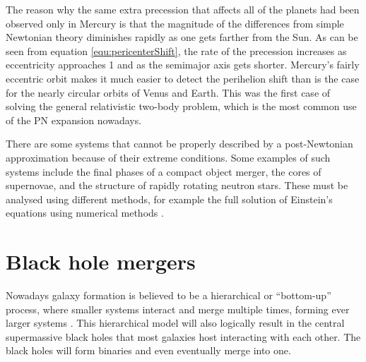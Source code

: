 \documentclass[english, oneside]{HYgradu}
\begin{document}
The reason why the same extra precession that affects all of the planets had been observed only in Mercury is that the magnitude of the differences from simple Newtonian theory diminishes rapidly as one gets farther from the Sun. As can be seen from equation \ref{equ:pericenterShift}, the rate of the precession increases as eccentricity approaches 1 and as the semimajor axis gets shorter.  Mercury's fairly eccentric orbit makes it much easier to detect the perihelion shift than is the case for the nearly circular orbits of Venus and Earth. 
This was the first case of solving the general relativistic two-body problem, which is the most common use of the PN expansion nowadays.
%

There are some systems that cannot be properly described by a post-Newtonian approximation because of their extreme conditions. Some examples of such systems include the final phases of a compact object merger, the cores of supernovae, and the structure of rapidly rotating neutron stars. These must be analysed using different methods, for example the full solution of Einstein's equations using numerical methods \citep{will:2006}. 

\section{Black hole mergers}

Nowadays galaxy formation is believed to be a hierarchical or ``bottom-up'' process, where smaller systems interact and merge multiple times, forming ever larger systems \citep{bt-galdyn}. This hierarchical model will also logically result in the central supermassive black holes that most galaxies host interacting with each other. The black holes will form binaries and even eventually merge into one.
\end{document}
